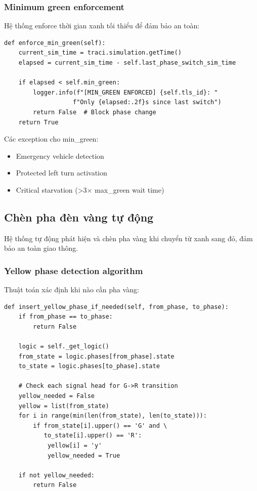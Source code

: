 \subsubsection{Minimum green enforcement}

Hệ thống enforce thời gian xanh tối thiểu để đảm bảo an toàn:

\begin{lstlisting}[style=py, caption={Minimum green time enforcement}]
def enforce_min_green(self):
    current_sim_time = traci.simulation.getTime()
    elapsed = current_sim_time - self.last_phase_switch_sim_time
    
    if elapsed < self.min_green:
        logger.info(f"[MIN_GREEN ENFORCED] {self.tls_id}: "
                   f"Only {elapsed:.2f}s since last switch")
        return False  # Block phase change
    return True
\end{lstlisting}

Các exception cho min\_green:
\begin{itemize}
    \item Emergency vehicle detection
    \item Protected left turn activation
    \item Critical starvation (>3× max\_green wait time)
\end{itemize}

\subsection{Chèn pha đèn vàng tự động}

Hệ thống tự động phát hiện và chèn pha vàng khi chuyển từ xanh sang đỏ, đảm bảo an toàn giao thông.

\subsubsection{Yellow phase detection algorithm}

Thuật toán xác định khi nào cần pha vàng:

\begin{lstlisting}[style=py, caption={Yellow phase necessity detection}]
def insert_yellow_phase_if_needed(self, from_phase, to_phase):
    if from_phase == to_phase:
        return False
        
    logic = self._get_logic()
    from_state = logic.phases[from_phase].state
    to_state = logic.phases[to_phase].state
    
    # Check each signal head for G->R transition
    yellow_needed = False
    yellow = list(from_state)
    for i in range(min(len(from_state), len(to_state))):
        if from_state[i].upper() == 'G' and \
           to_state[i].upper() == 'R':
            yellow[i] = 'y'
            yellow_needed = True
    
    if not yellow_needed:
        return False
\end{lstlisting}

